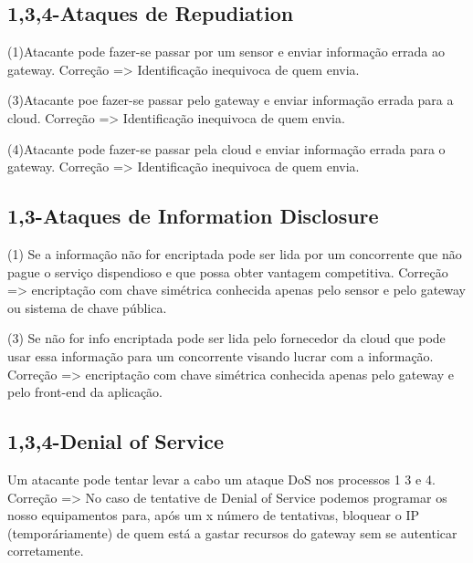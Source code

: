 \subsection{1,3,4-Ataques de Repudiation}
\par\hfill
\par(1)Atacante pode fazer-se passar por um sensor e enviar informação errada ao gateway.\newline
Correção => Identificação inequivoca de quem envia.\newline
\par(3)Atacante poe fazer-se passar pelo gateway e enviar informação errada para a cloud.\newline
Correção => Identificação inequivoca de quem envia.\newline
\par(4)Atacante pode fazer-se passar pela cloud e enviar informação errada para o gateway.\newline
Correção => Identificação inequivoca de quem envia.\newline

\subsection{1,3-Ataques de Information Disclosure}
\par\hfill
\par (1) Se a informação não for encriptada pode ser lida por um concorrente que não pague o serviço dispendioso e que possa obter vantagem competitiva.\newline
Correção => encriptação com chave simétrica conhecida apenas pelo sensor e  pelo gateway ou sistema de chave pública.\newline
\par (3) Se não for info encriptada pode ser lida pelo fornecedor da cloud que pode usar essa informação para um concorrente visando lucrar com a informação.\newline
Correção => encriptação com chave simétrica conhecida apenas pelo gateway e pelo front-end da aplicação.\newline

\subsection{1,3,4-Denial of Service}
\par\hfill
\par Um atacante pode tentar levar a cabo um ataque DoS nos processos 1 3 e 4.
Correção => No caso de tentative de Denial of Service podemos programar os nosso equipamentos para, após um x número de tentativas, bloquear o IP (temporáriamente) de quem está a gastar recursos do gateway sem se autenticar corretamente.\newline


